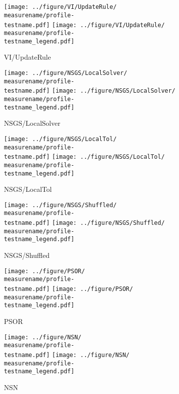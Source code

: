 \documentclass[a4paper]{article}
\begin{document}
\section{\testnamechar}
\begin{figure}[htbp]
  \centering
  \texttt{[image: ../figure/VI/UpdateRule/\\measurename/profile-\\testname.pdf]}
  \texttt{[image: ../figure/VI/UpdateRule/\\measurename/profile-\\testname\_legend.pdf]}
\caption{\testnamechar{  } \measurename{  } VI/UpdateRule}
\end{figure}
\begin{figure}[htbp]
  \centering
  \texttt{[image: ../figure/NSGS/LocalSolver/\\measurename/profile-\\testname.pdf]}
  \texttt{[image: ../figure/NSGS/LocalSolver/\\measurename/profile-\\testname\_legend.pdf]}
\caption{\testnamechar{  } \measurename { }NSGS/LocalSolver}
\end{figure}
\begin{figure}[htbp]
  \centering
  \texttt{[image: ../figure/NSGS/LocalTol/\\measurename/profile-\\testname.pdf]}
  \texttt{[image: ../figure/NSGS/LocalTol/\\measurename/profile-\\testname\_legend.pdf]}
\caption{\testnamechar{  } \measurename { }NSGS/LocalTol}
\end{figure}

\begin{figure}[htbp]
  \centering
  \texttt{[image: ../figure/NSGS/Shuffled/\\measurename/profile-\\testname.pdf]}
  \texttt{[image: ../figure/NSGS/Shuffled/\\measurename/profile-\\testname\_legend.pdf]}
\caption{\testnamechar{  } \measurename { }NSGS/Shuffled}
\end{figure}

\begin{figure}[htbp]
  \centering
  \texttt{[image: ../figure/PSOR/\\measurename/profile-\\testname.pdf]}
  \texttt{[image: ../figure/PSOR/\\measurename/profile-\\testname\_legend.pdf]}
\caption{\testnamechar{  } \measurename { }PSOR}
\end{figure}

\begin{figure}[htbp]
  \centering
  \texttt{[image: ../figure/NSN/\\measurename/profile-\\testname.pdf]}
  \texttt{[image: ../figure/NSN/\\measurename/profile-\\testname\_legend.pdf]}
\caption{\testnamechar{  } \measurename { }NSN}
\end{figure}
\end{document}
